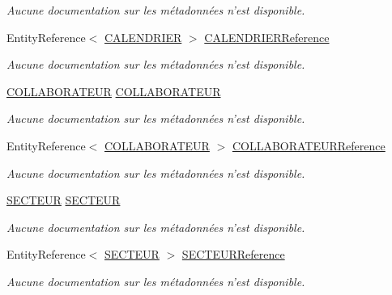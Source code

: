 \begin{DoxyCompactItemize}
\begin{DoxyCompactList}\small\item\em Aucune documentation sur les métadonnées n'est disponible. \end{DoxyCompactList}\item 
Entity\-Reference$<$ \hyperlink{class_model_1_1_c_a_l_e_n_d_r_i_e_r}{C\-A\-L\-E\-N\-D\-R\-I\-E\-R} $>$ \hyperlink{class_model_1_1_e_t_r_e___r_e_s_p_o_n_s_a_b_l_e_a865fabbad6013698e39e4039dacd62be}{C\-A\-L\-E\-N\-D\-R\-I\-E\-R\-Reference}
\begin{DoxyCompactList}\small\item\em Aucune documentation sur les métadonnées n'est disponible. \end{DoxyCompactList}\item 
\hyperlink{class_model_1_1_c_o_l_l_a_b_o_r_a_t_e_u_r}{C\-O\-L\-L\-A\-B\-O\-R\-A\-T\-E\-U\-R} \hyperlink{class_model_1_1_e_t_r_e___r_e_s_p_o_n_s_a_b_l_e_ad37e4916b9d01b522e7dee13ea668f2f}{C\-O\-L\-L\-A\-B\-O\-R\-A\-T\-E\-U\-R}
\begin{DoxyCompactList}\small\item\em Aucune documentation sur les métadonnées n'est disponible. \end{DoxyCompactList}\item 
Entity\-Reference$<$ \hyperlink{class_model_1_1_c_o_l_l_a_b_o_r_a_t_e_u_r}{C\-O\-L\-L\-A\-B\-O\-R\-A\-T\-E\-U\-R} $>$ \hyperlink{class_model_1_1_e_t_r_e___r_e_s_p_o_n_s_a_b_l_e_a1dd54529ec10369d8720c52243162189}{C\-O\-L\-L\-A\-B\-O\-R\-A\-T\-E\-U\-R\-Reference}
\begin{DoxyCompactList}\small\item\em Aucune documentation sur les métadonnées n'est disponible. \end{DoxyCompactList}\item 
\hyperlink{class_model_1_1_s_e_c_t_e_u_r}{S\-E\-C\-T\-E\-U\-R} \hyperlink{class_model_1_1_e_t_r_e___r_e_s_p_o_n_s_a_b_l_e_afc83419e745174726df079da891c6973}{S\-E\-C\-T\-E\-U\-R}
\begin{DoxyCompactList}\small\item\em Aucune documentation sur les métadonnées n'est disponible. \end{DoxyCompactList}\item 
Entity\-Reference$<$ \hyperlink{class_model_1_1_s_e_c_t_e_u_r}{S\-E\-C\-T\-E\-U\-R} $>$ \hyperlink{class_model_1_1_e_t_r_e___r_e_s_p_o_n_s_a_b_l_e_a87465cb676675c817cef32ad96f182e3}{S\-E\-C\-T\-E\-U\-R\-Reference}
\begin{DoxyCompactList}\small\item\em Aucune documentation sur les métadonnées n'est disponible. \end{DoxyCompactList}\end{DoxyCompactItemize}


